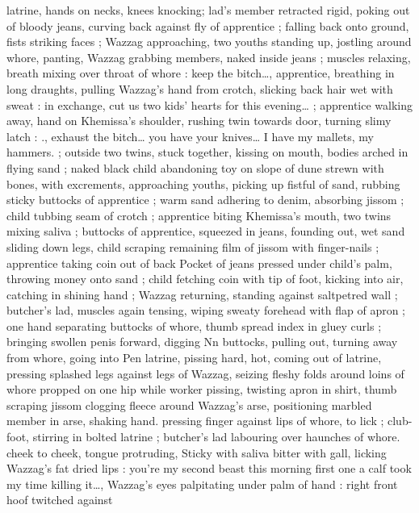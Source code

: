 latrine, hands on necks, knees knocking; lad's member retracted 
rigid, poking out of bloody jeans, curving back against fly of 
apprentice ; falling back onto ground, fists striking faces ; Wazzag 
approaching, two youths standing up, jostling around whore, panting, 
Wazzag grabbing members, naked inside jeans ; muscles relaxing, 
breath mixing over throat of whore : {\gl} keep the bitch{\ldots}{\gr}, apprentice, 
breathing in long draughts, pulling Wazzag's hand from crotch, 
slicking back hair wet with sweat : {\gl}{\td} in exchange, cut us two kids' 
hearts for this evening{\ldots}{\gr} ; apprentice walking away, hand on 
Khemissa's shoulder, rushing twin towards door, turning slimy latch : 
{\gl}., exhaust the bitch{\ldots} you have your knives{\ldots} I have my mallets, my 
hammers.{\gr} ; outside {\td} two twins, stuck together, kissing on mouth, 
bodies arched in flying sand ; naked black child abandoning toy on 
slope of dune strewn with bones, with excrements, approaching 
youths, picking up fistful of sand, rubbing sticky buttocks of 
apprentice ; warm sand adhering to denim, absorbing jissom ; child 
tubbing seam of crotch ; apprentice biting Khemissa's mouth, two 
twins mixing saliva ; buttocks of apprentice, squeezed in jeans, 
founding out, wet sand sliding down legs, child scraping remaining 
film of jissom with finger-nails ; apprentice taking coin out of back 
Pocket of jeans pressed under child's palm, throwing money onto 
sand ; child fetching coin with tip of foot, kicking into air, catching in 
shining hand ; Wazzag returning, standing against saltpetred wall ; 
butcher's lad, muscles again tensing, wiping sweaty forehead with 
flap of apron ; one hand separating buttocks of whore, thumb spread 
index in gluey curls ; bringing swollen penis forward, digging 
Nn buttocks, pulling out, turning away from whore, going into 
Pen latrine, pissing hard, hot, coming out of latrine, pressing 
splashed legs against legs of Wazzag, seizing fleshy folds around 
loins of whore propped on one hip while worker pissing, twisting 
apron in shirt, thumb scraping jissom clogging fleece around 
Wazzag's arse, positioning marbled member in arse, shaking hand. 
pressing finger against lips of whore, to lick ; club-foot, stirring in 
bolted latrine ; butcher's lad labouring over haunches of whore. 
cheek to cheek, tongue protruding, Sticky with saliva bitter with gall, 
licking Wazzag's fat dried lips : {\gl}{\td} you're my second beast this 
morning{\td} first one a calf{\td} took my time killing it{\ldots}{\gr}, Wazzag's eyes 
palpitating under palm of hand : {\gl}{\td} right front hoof twitched against 
